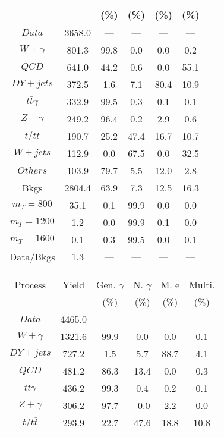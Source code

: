 \begin{figure}
\begin{minipage}[c]{0.32\textwidth}
{\begin{tabular}{cccccc}
 &  & (\%) & (\%) & (\%) & (\%)  \\
\hline
                                                                      $ Data $ &  3658.0 &  --- &  --- &  --- &  ---\\
$ W+\gamma $ &  801.3 &  99.8 &  0.0 &  0.0 &  0.2\\
$ QCD $ &  641.0 &  44.2 &  0.6 &  0.0 &  55.1\\
$ DY+jets $ &  372.5 &  1.6 &  7.1 &  80.4 &  10.9\\
$ t\bar{t}\gamma $ &  332.9 &  99.5 &  0.3 &  0.1 &  0.1\\
$ Z+\gamma $ &  249.2 &  96.4 &  0.2 &  2.9 &  0.6\\
$ t/t\bar{t} $ &  190.7 &  25.2 &  47.4 &  16.7 &  10.7\\
$ W+jets $ &  112.9 &  0.0 &  67.5 &  0.0 &  32.5\\
$ Others $ &  103.9 &  79.7 &  5.5 &  12.0 &  2.8\\
Bkgs &  2804.4 &  63.9 &  7.3 &  12.5 &  16.3\\
$ m_{T} = 800 $ &  35.1 &  0.1 &  99.9 &  0.0 &  0.0\\
$ m_{T} = 1200 $ &  1.2 &  0.0 &  99.9 &  0.1 &  0.0\\
$ m_{T} = 1600 $ &  0.1 &  0.3 &  99.5 &  0.0 &  0.1\\
Data/Bkgs &  1.3 &  --- &  --- &  --- &  ---\\
\hline
\end{tabular}
}
\end{minipage}
\begin{minipage}[c]{0.32\textwidth}
\centering
\tiny{
\begin{tabular}{cccccc}
\hline
Process & Yield & Gen. $\gamma$ & N. $\gamma$ & M. e & Multi. \\
 &  & (\%) & (\%) & (\%) & (\%)  \\
\hline
                                                                      $ Data $ &  4465.0 &  --- &  --- &  --- &  ---\\
$ W+\gamma $ &  1321.6 &  99.9 &  0.0 &  0.0 &  0.1\\
$ DY+jets $ &  727.2 &  1.5 &  5.7 &  88.7 &  4.1\\
$ QCD $ &  481.2 &  86.3 &  13.4 &  0.0 &  0.3\\
$ t\bar{t}\gamma $ &  436.2 &  99.3 &  0.4 &  0.2 &  0.1\\
$ Z+\gamma $ &  306.2 &  97.7 &  -0.0 &  2.2 &  0.0\\
$ t/t\bar{t} $ &  293.9 &  22.7 &  47.6 &  18.8 &  10.8\\

\end{tabular}}
\end{minipage}
\end{figure}
